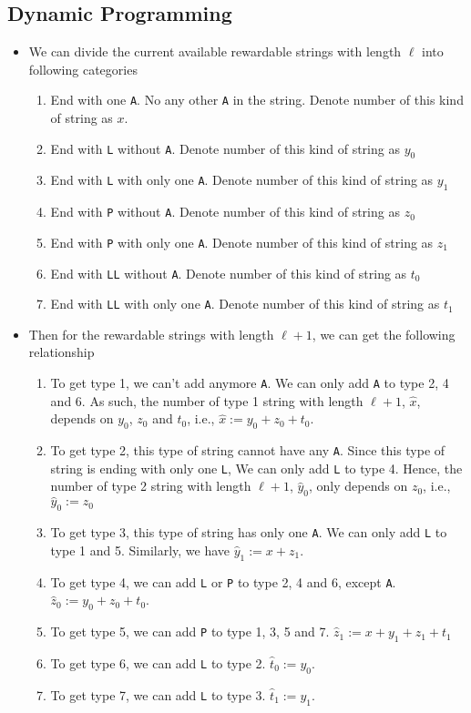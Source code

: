 \subsection{Dynamic Programming}
\begin{itemize}
\item We can divide the current available rewardable strings with length $\ell$ into following categories
\begin{enumerate}
\item End with one \texttt{A}. No any other \texttt{A} in the string. Denote number of this kind of string as $x$.
\item End with \texttt{L} without \texttt{A}. Denote number of this kind of string as $y_0$
\item End with \texttt{L} with only one \texttt{A}. Denote number of this kind of string as $y_1$
\item End with \texttt{P} without \texttt{A}. Denote number of this kind of string as $z_0$
\item End with \texttt{P} with only one \texttt{A}. Denote number of this kind of string as $z_1$
\item End with \texttt{LL} without \texttt{A}. Denote number of this kind of string as $t_0$
\item End with \texttt{LL} with only one \texttt{A}. Denote number of this kind of string as $t_1$
\end{enumerate}
\item Then for the rewardable strings with length $\ell+1$, we can get the following relationship
\begin{enumerate}
\item To get type 1, we can't add anymore \texttt{A}. We can only add \texttt{A} to type 2, 4 and 6. As such, the number of type 1 string with length $\ell+1$, $\hat{x}$, depends on $y_0$, $z_0$ and $t_0$, i.e., $\hat{x}:=y_0+z_0+t_0$.
\item To get type 2, this type of string cannot have any \texttt{A}. Since this type of string is ending with only one \texttt{L}, We can only add \texttt{L} to type 4. Hence, the number of type 2 string with length $\ell+1$, $\hat{y}_0$, only depends on $z_0$, i.e., $\hat{y}_0:=z_0$
\item To get type 3, this type of string has only one \texttt{A}. We can only add \texttt{L} to type 1 and 5. Similarly, we have $\hat{y}_1:=x+z_1$.
\item To get type 4, we can add \texttt{L} or \texttt{P} to type 2, 4 and 6, except \texttt{A}. $\hat{z}_0:= y_0+z_0+t_0$.
\item To get type 5, we can add \texttt{P} to type 1, 3, 5 and 7. $\hat{z}_1:=x + y_1 + z_1 + t_1$
\item To get type 6, we can add \texttt{L} to type 2. $\hat{t}_0:=y_0$.
\item To get type 7, we can add \texttt{L} to type 3. $\hat{t}_1:=y_1$.
\end{enumerate}
\end{itemize}

